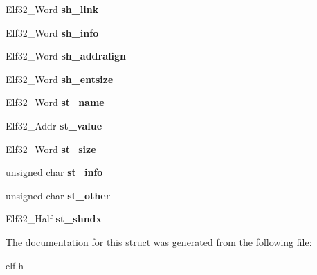 \begin{DoxyCompactItemize}
\mbox{\label{struct____attribute_a2f9248dd517dbf0c8d5f7ffb010a6554}} 
Elf32\+\_\+\+Word {\bfseries sh\+\_\+link}
\item 
\mbox{\label{struct____attribute_a797d462ca34cfe69d9d6bb4374b4e105}} 
Elf32\+\_\+\+Word {\bfseries sh\+\_\+info}
\item 
\mbox{\label{struct____attribute_a5a5c4c9677eb1844fdcafc5e06ac1c1e}} 
Elf32\+\_\+\+Word {\bfseries sh\+\_\+addralign}
\item 
\mbox{\label{struct____attribute_a9ab4b3ae84fda2c787fa3a1cd5af079b}} 
Elf32\+\_\+\+Word {\bfseries sh\+\_\+entsize}
\item 
\mbox{\label{struct____attribute_a06607ddc7d13bd57ecf1ec46d85e6bac}} 
Elf32\+\_\+\+Word {\bfseries st\+\_\+name}
\item 
\mbox{\label{struct____attribute_a7e7f6ea5ddba871432226fec76ef9a49}} 
Elf32\+\_\+\+Addr {\bfseries st\+\_\+value}
\item 
\mbox{\label{struct____attribute_ace8456a38d6bc9e323ea55f695a8065c}} 
Elf32\+\_\+\+Word {\bfseries st\+\_\+size}
\item 
\mbox{\label{struct____attribute_a2d82d0315d990f32d4a1aadeaa8b3220}} 
unsigned char {\bfseries st\+\_\+info}
\item 
\mbox{\label{struct____attribute_ada05887c1626975de89f24c438c89ef1}} 
unsigned char {\bfseries st\+\_\+other}
\item 
\mbox{\label{struct____attribute_a63bd88d928779f676ccd56f9540aca62}} 
Elf32\+\_\+\+Half {\bfseries st\+\_\+shndx}
\end{DoxyCompactItemize}


The documentation for this struct was generated from the following file\+:\begin{DoxyCompactItemize}
\item 
elf.\+h\end{DoxyCompactItemize}
